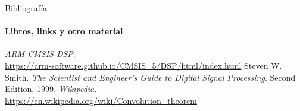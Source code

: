 \begin{frame}{Bibliografía}
   \framesubtitle{Libros, links y otro material}
   \begin{thebibliography}{9}
         \emph{ARM CMSIS DSP}. \\
         \href {https://arm-software.github.io/CMSIS_5/DSP/html/index.html}{https://arm-software.github.io/CMSIS\_5/DSP/html/index.html}
         Steven W. Smith.
         \emph{The Scientist and Engineer's Guide to Digital Signal Processing}.
         Second Edition, 1999.
         \emph{Wikipedia}. \\
         \href {https://en.wikipedia.org/wiki/Convolution\_theorem}{https://en.wikipedia.org/wiki/Convolution\_theorem}
   \end{thebibliography}
\end{frame}


